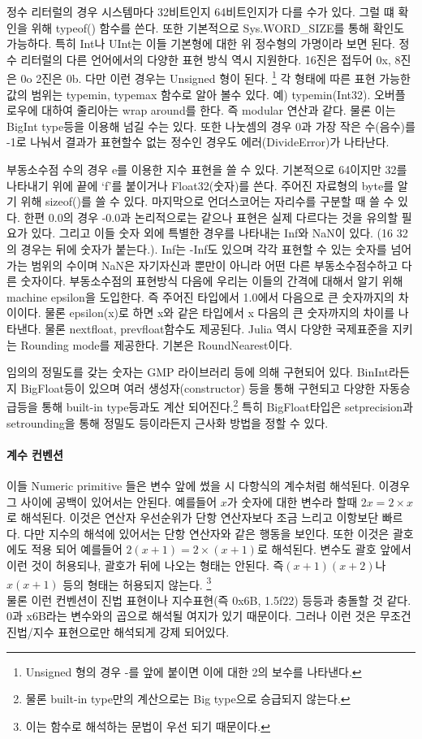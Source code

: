 \documentclass[a4paper, 11pt]{report}
\theoremstyle{definition}
\begin{document}
정수 리터럴의 경우 시스템마다 32비트인지 64비트인지가 다를 수가 있다. 그럴 떄 확인을 위해 typeof() 함수를 쓴다.
또한 기본적으로 Sys.WORD\_SIZE를 통해 확인도 가능하다. 특히 Int나 UInt는 이들 기본형에 대한 위 정수형의 가명이라 보면 된다.
정수 리터럴의 다른 언어에서의 다양한 표현 방식 역시 지원한다. 16진은 접두어 0x, 8진은 0o 2진은 0b. 다만 이런 경우는 Unsigned 형이 된다.
\footnote{Unsigned 형의 경우 -를 앞에 붙이면 이에 대한 2의 보수를 나타낸다.}
각 형태에 따른 표현 가능한 값의 범위는 typemin, typemax 함수로 알아 볼수 있다. 예) typemin(Int32).
오버플로우에 대하여 줄리아는 wrap around를 한다. 즉 modular 연산과 같다. 물론 이는 BigInt type등을 이용해 넘길 수는 있다.
또한 나눗셈의 경우 0과 가장 작은 수(음수)를 -1로 나눠서 결과가 표현할수 없는 정수인 경우도 에러(DivideError)가 나타난다.

부동소수점 수의 경우 e를 이용한 지수 표현을 쓸 수 있다. 기본적으로 64이지만 32를 나타내기 위에 끝에 `f'를 붙이거나 Float32(숫자)를 쓴다.
주어진 자료형의 byte를 알기 위해 sizeof()를 쓸 수 있다. 마지막으로 언더스코어는 자리수를 구분할 때 쓸 수 있다. 한편 0.0의 경우 -0.0과
논리적으로는 같으나 표현은 실제 다르다는 것을 유의할 필요가 있다. 그리고 이들 숫자 외에 특별한 경우를 나타내는 Inf와 NaN이 있다.
(16 32의 경우는 뒤에 숫자가 붙는다.). Inf는 -Inf도 있으며 각각 표현할 수 있는 숫자를 넘어 가는 범위의 수이며 NaN은 자기자신과 뿐만이 아니라
어떤 다른 부동소수점수하고 다른 숫자이다.
부동소수점의 표현방식 다음에 우리는 이들의 간격에 대해서 알기 위해 machine epsilon을 도입한다. 즉 주어진 타입에서 1.0에서 다음으로 큰 숫자까지의 차이이다.
물론 epsilon(x)로 하면 x와 같은 타입에서 x 다음의 큰 숫자까지의 차이를 나타낸다. 물론 nextfloat, prevfloat함수도 제공된다.
Julia 역시 다양한 국제표준을 지키는 Rounding mode를 제공한다. 기본은 RoundNearest이다.

임의의 정밀도를 갖는 숫자는 GMP 라이브러리 등에 의해 구현되어 있다. BinInt라든지 BigFloat등이 있으며 여러 생성자(constructor) 등을 통해
구현되고 다양한 자동승급등을 통해 built-in type등과도 계산 되어진다.\footnote{물론 built-in type만의 계산으로는 Big type으로 승급되지 않는다.}
특히 BigFloat타입은 setprecision과 setrounding을 통해 정밀도 등이라든지 근사화 방법을 정할 수 있다.

\paragraph{계수 컨벤션}
이들 Numeric primitive 들은 변수 앞에 썼을 시 다항식의 계수처럼 해석된다. 이경우 그 사이에 공백이 있어서는 안된다. 예를들어 
$x$가 숫자에 대한 변수라 할때 $2x = 2\times x$로 해석된다. 이것은 연산자 우선순위가 단항 연산자보다 조금 느리고 이항보단 빠르다.
다만 지수의 해석에 있어서는 단항 연산자와 같은 행동을 보인다. 또한 이것은 괄호에도 적용 되어 
예를들어 $2(x+1) = 2 \times (x+1)$로 해석된다.
변수도 괄호 앞에서 이런 것이 허용되나, 괄호가 뒤에 나오는 형태는 안된다. 즉$(x+1)(x+2)$나 $x(x+1)$ 등의 형태는 허용되지 않는다.
\footnote{이는 함수로 해석하는 문법이 우선 되기 때문이다.} \\
물론 이런 컨벤션이 진법 표현이나 지수표현(즉 0x6B, 1.5f22) 등등과 충돌할 것 같다. 0과 x6B라는 변수와의 곱으로 해석될 여지가 있기 때문이다. 
그러나 이런 것은 무조건 진법/지수 표현으로만 해석되게 강제 되어있다.
\end{document}
